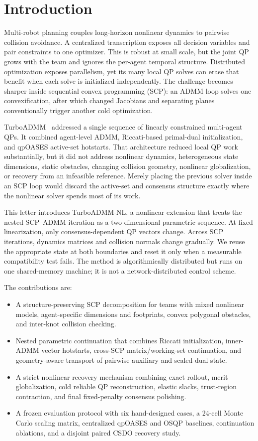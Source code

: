 \documentclass[letterpaper,10pt,conference]{ieeeconf}
\newcommand{\method}{TurboADMM-NL}
\newcommand{\oldmethod}{TurboADMM}
\begin{document}
\section{Introduction}
\label{sec:introduction}
Multi-robot planning couples long-horizon nonlinear dynamics to pairwise
collision avoidance. A centralized transcription exposes all decision
variables and pair constraints to one optimizer. This is robust at small
scale, but the joint QP grows with the team and ignores the per-agent temporal
structure. Distributed optimization exposes parallelism, yet its many local QP
solves can erase that benefit when each solve is initialized independently.
The challenge becomes sharper inside sequential convex programming (SCP): an
ADMM loop solves one convexification, after which changed Jacobians and
separating planes conventionally trigger another cold optimization.

\oldmethod~\cite{Chen2026TurboADMM} addressed a single sequence
of linearly constrained multi-agent QPs. It combined agent-level ADMM,
Riccati-based primal-dual initialization, and qpOASES active-set hotstarts.
That architecture reduced local QP work substantially, but it did not address
nonlinear dynamics, heterogeneous state dimensions, static obstacles, changing
collision geometry, nonlinear globalization, or recovery from an infeasible
reference. Merely placing the previous solver inside an SCP loop would discard
the active-set and consensus structure exactly where the nonlinear solver
spends most of its work.

This letter introduces \method, a nonlinear extension that treats the nested
SCP--ADMM iteration as a two-dimensional parametric sequence. At fixed
linearization, only consensus-dependent QP vectors change. Across SCP
iterations, dynamics matrices and collision normals change gradually. We reuse
the appropriate state at both boundaries and reset it only when a measurable
compatibility test fails. The method is algorithmically distributed but runs
on one shared-memory machine; it is not a network-distributed control scheme.

The contributions are:
\begin{itemize}
    \item A structure-preserving SCP decomposition for teams with mixed
    nonlinear models, agent-specific dimensions and footprints, convex
    polygonal obstacles, and inter-knot collision checking.
    \item Nested parametric continuation that combines Riccati initialization,
    inner-ADMM vector hotstarts, cross-SCP matrix/working-set continuation, and
    geometry-aware transport of pairwise auxiliary and scaled-dual state.
    \item A strict nonlinear recovery mechanism combining exact rollout,
    merit globalization, cold reliable QP reconstruction, elastic slacks,
    trust-region contraction, and final fixed-penalty consensus polishing.
    \item A frozen evaluation protocol with six hand-designed cases, a
    24-cell Monte Carlo scaling matrix, centralized qpOASES and OSQP baselines,
    continuation ablations, and a disjoint paired CSDO recovery study.
\end{itemize}
\end{document}

